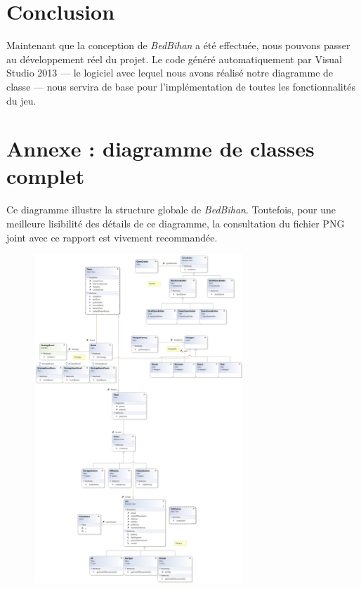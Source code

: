 \section*{Conclusion}
Maintenant que la conception de \emph{BedBihan} a été effectuée, nous pouvons passer au développement réel du projet. Le code généré automatiquement par Visual Studio 2013 --- le logiciel avec lequel nous avons réalisé notre diagramme de classe --- nous servira de base pour l'implémentation de toutes les fonctionnalités du jeu.


\newpage
\appendix
\section*{Annexe : diagramme de classes complet}
Ce diagramme illustre la structure globale de \emph{BedBihan}. Toutefois, pour une meilleure lisibilité des détails de ce diagramme, la consultation du fichier PNG joint avec ce rapport est vivement recommandée.
\begin{figure}[hb]
		\begin{center}
			\includegraphics[width=0.7\textwidth]{figure/entire_class_diagram_report.png}
		\end{center}
		
		\label{fig:class_global}
	\end{figure}